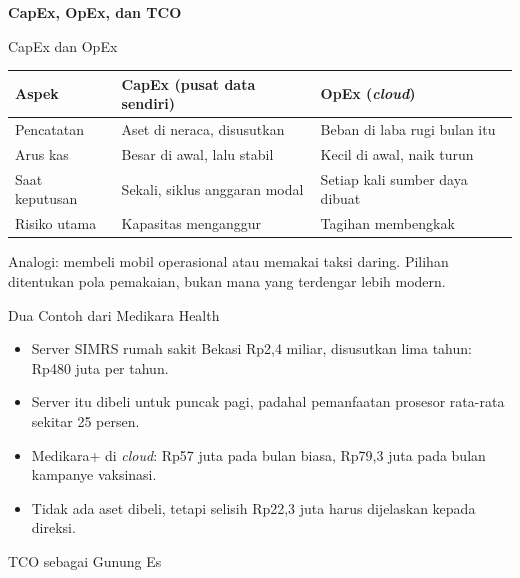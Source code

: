 \documentclass[aspectratio=169, table, 12pt]{beamer}
\begin{document}
\begin{frame}{\hfill}
  \centering
  \Huge{\textbf{CapEx, OpEx, dan TCO}}
\end{frame}

\begin{frame}{{\Large CapEx dan OpEx}}
  \footnotesize
  \begin{tabularx}{\textwidth}{>{\raggedright\arraybackslash}p{2.6cm}
      >{\raggedright\arraybackslash}X >{\raggedright\arraybackslash}X}
    \hline
    \textbf{Aspek} & \textbf{CapEx (pusat data sendiri)} & \textbf{OpEx (\textit{cloud})} \\
    \hline
    Pencatatan & Aset di neraca, disusutkan & Beban di laba rugi bulan itu \\
    \hline
    Arus kas & Besar di awal, lalu stabil & Kecil di awal, naik turun \\
    \hline
    Saat keputusan & Sekali, siklus anggaran modal & Setiap kali sumber daya
      dibuat \\
    \hline
    Risiko utama & Kapasitas menganggur & Tagihan membengkak \\
    \hline
  \end{tabularx}

  \vspace{10pt}
  \small
  Analogi: membeli mobil operasional atau memakai taksi daring. Pilihan
  ditentukan pola pemakaian, bukan mana yang terdengar lebih modern.
\end{frame}

\begin{frame}{{\Large Dua Contoh dari Medikara Health}}
  \vspace{10pt}
  \begin{itemize}
    \item Server SIMRS rumah sakit Bekasi Rp2,4 miliar, disusutkan lima tahun:
          Rp480 juta per tahun.
    \item Server itu dibeli untuk puncak pagi, padahal pemanfaatan prosesor
          rata-rata sekitar 25 persen.
    \item Medikara+ di \textit{cloud}: Rp57 juta pada bulan biasa, Rp79,3 juta
          pada bulan kampanye vaksinasi.
    \item Tidak ada aset dibeli, tetapi selisih Rp22,3 juta harus dijelaskan
          kepada direksi.
  \end{itemize}
\end{frame}

\begin{frame}{{\Large TCO sebagai Gunung Es}}
  \centering
\end{frame}
\end{document}
